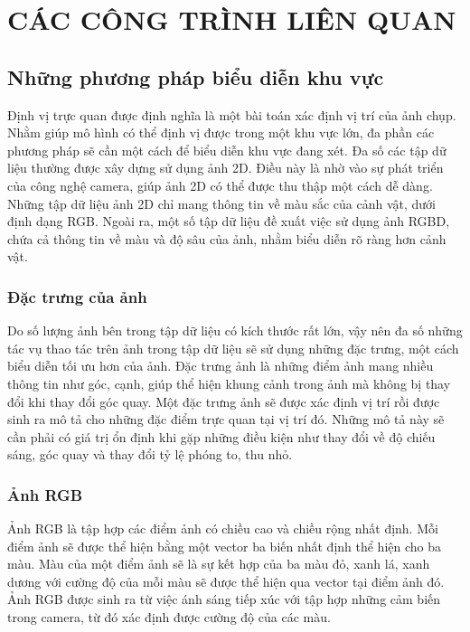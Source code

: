 \chapter{CÁC CÔNG TRÌNH LIÊN QUAN}

\section{Những phương pháp biểu diễn khu vực}

Định vị trực quan được định nghĩa là một bài toán xác định vị trí của ảnh chụp. Nhằm giúp mô hình có thể định vị được trong một khu vực lớn, đa phần các phương pháp sẽ cần một cách để biểu diễn khu vực đang xét. Đa số các tập dữ liệu thường được xây dựng sử dụng ảnh 2D. Điều này là nhờ vào sự phát triển của công nghệ camera, giúp ảnh 2D có thể được thu thập một cách dễ dàng. Những tập dữ liệu ảnh 2D chỉ mang thông tin về màu sắc của cảnh vật, dưới định dạng RGB. Ngoài ra, một số tập dữ liệu đề xuất việc sử dụng ảnh RGBD, chứa cả thông tin về màu và độ sâu của ảnh, nhằm biểu diễn rõ ràng hơn cảnh vật.

\subsection{Đặc trưng của ảnh}

Do số lượng ảnh bên trong tập dữ liệu có kích thước rất lớn, vậy nên đa số những tác vụ thao tác trên ảnh trong tập dữ liệu sẽ sử dụng những đặc trưng, một cách biểu diễn tối ưu hơn của ảnh. Đặc trưng ảnh là những điểm ảnh mang nhiều thông tin như góc, cạnh, giúp thể hiện khung cảnh trong ảnh mà không bị thay đổi khi thay đổi góc quay. Một đặc trưng ảnh sẽ được xác định vị trí rồi được sinh ra mô tả cho những đặc điểm trực quan tại vị trí đó. Những mô tả này sẽ cần phải có giá trị ổn định khi gặp những điều kiện như thay đổi về độ chiếu sáng, góc quay và thay đổi tỷ lệ phóng to, thu nhỏ.

\subsection{Ảnh RGB}

Ảnh RGB là tập hợp các điểm ảnh có chiều cao và chiều rộng nhất định. Mỗi điểm ảnh sẽ được thể hiện bằng một vector ba biến nhất định thể hiện cho ba màu. Màu của một điểm ảnh sẽ là sự kết hợp của ba màu đỏ, xanh lá, xanh dương với cường độ của mỗi màu sẽ được thể hiện qua vector tại điểm ảnh đó. Ảnh RGB được sinh ra từ việc ánh sáng tiếp xúc với tập hợp những cảm biến trong camera, từ đó xác định được cường độ của các màu.

